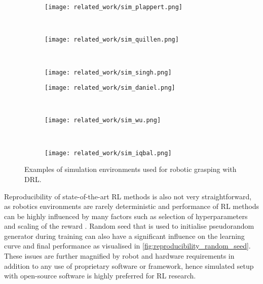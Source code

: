 \begin{figure}[ht]
    \centering
    \begin{subfigure}[ht]{0.34\textwidth}
        \centering
        \texttt{[image: related\_work/sim\_plappert.png]}
        \caption*{\protect\citet{plappert_multi-goal_2018}}
    \end{subfigure}%
    ~
    \begin{subfigure}[ht]{0.3\textwidth}
        \centering
        \texttt{[image: related\_work/sim\_quillen.png]}
        \caption*{\protect\citet{quillen_deep_2018}}
    \end{subfigure}%
    ~
    \begin{subfigure}[ht]{0.34\textwidth}
        \centering
        \texttt{[image: related\_work/sim\_singh.png]}
        \caption*{\protect\citet{singh_end--end_2019}}
    \end{subfigure}%

    \smallskip

    \begin{subfigure}[ht]{0.34\textwidth}
        \centering
        \texttt{[image: related\_work/sim\_daniel.png]}
        \caption*{\protect\citet{daniel_deep_2020}}
    \end{subfigure}%
    ~
    \begin{subfigure}[ht]{0.3\textwidth}
        \centering
        \texttt{[image: related\_work/sim\_wu.png]}
        \caption*{\protect\citet{wu_generative_2020}}
    \end{subfigure}%
    ~
    \begin{subfigure}[ht]{0.34\textwidth}
        \centering
        \texttt{[image: related\_work/sim\_iqbal.png]}
        \caption*{\protect\citet{iqbal_toward_2020}}
    \end{subfigure}%
    \caption{Examples of simulation environments used for robotic grasping with DRL.}
    \label{fig:rw_simulation_envs}
\end{figure}

Reproducibility of state-of-the-art RL methods is also not very straightforward, as robotics environments are rarely deterministic and performance of RL methods can be highly influenced by many factors such as selection of hyperparameters and scaling of the reward \cite{henderson_deep_2018}. Random seed that is used to initialise pseudorandom generator during training can also have a significant influence on the learning curve and final performance as visualised in \autoref{fig:reproducibility_random_seed}. These issues are further magnified by robot and hardware requirements in addition to any use of proprietary software or framework, hence simulated setup with open-source software is highly preferred for RL research.

